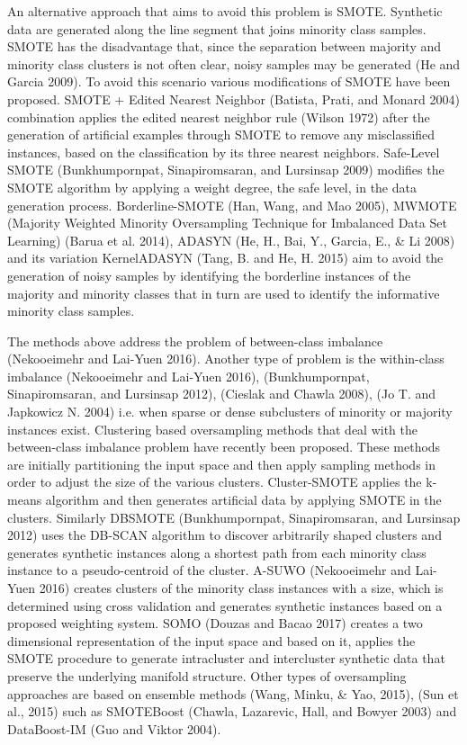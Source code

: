 \documentclass[parskip=full]{scrartcl}
\begin{document}
An alternative approach that aims to avoid this problem is SMOTE. Synthetic data
are generated along the line segment that joins minority class samples. SMOTE
has the disadvantage that, since the separation between majority and minority
class clusters is not often clear, noisy samples may be generated (He and Garcia
2009). To avoid this scenario various modifications of SMOTE have been proposed.
SMOTE + Edited Nearest Neighbor (Batista, Prati, and Monard 2004) combination
applies the edited nearest neighbor rule (Wilson 1972) after the generation of
artificial examples through SMOTE to remove any misclassified instances, based
on the classification by its three nearest neighbors. Safe-Level SMOTE
(Bunkhumpornpat, Sinapiromsaran, and Lursinsap 2009) modifies the SMOTE
algorithm by applying a weight degree, the safe level, in the data generation
process. Borderline-SMOTE (Han, Wang, and Mao 2005), MWMOTE (Majority Weighted
Minority Oversampling Technique for Imbalanced Data Set Learning)  (Barua et al.
2014), ADASYN (He, H., Bai, Y., Garcia, E., & Li 2008) and its variation
KernelADASYN (Tang, B. and He, H. 2015) aim to avoid the generation of noisy
samples by identifying the borderline instances of the majority and minority
classes that in turn are used to identify the informative minority class
samples.  

The methods above address the problem of between-class imbalance (Nekooeimehr
and Lai-Yuen 2016). Another type of problem is the within-class imbalance
(Nekooeimehr and Lai-Yuen 2016), (Bunkhumpornpat, Sinapiromsaran, and Lursinsap
2012), (Cieslak and Chawla 2008), (Jo T. and Japkowicz N. 2004) i.e. when sparse
or dense subclusters of minority or majority instances exist.  Clustering based
oversampling methods that deal with the between-class imbalance problem have
recently been proposed. These methods are initially partitioning the input space
and then apply sampling methods in order to adjust the size of the various
clusters. Cluster-SMOTE applies the k-means algorithm and then generates
artificial data by applying SMOTE in the clusters. Similarly DBSMOTE
(Bunkhumpornpat, Sinapiromsaran, and Lursinsap 2012) uses the DB-SCAN algorithm
to discover arbitrarily shaped clusters and generates synthetic instances along
a shortest path from each minority class instance to a pseudo-centroid of the
cluster. A-SUWO (Nekooeimehr and Lai-Yuen 2016) creates clusters of the minority
class instances with a size, which is determined using cross validation and
generates synthetic instances based on a proposed weighting system. SOMO (Douzas
and Bacao 2017) creates a two dimensional representation of the input space and
based on it, applies the SMOTE procedure to generate intracluster and
intercluster synthetic data that preserve the underlying manifold structure.
Other types of oversampling approaches are based on ensemble methods (Wang,
Minku, & Yao, 2015), (Sun et al., 2015) such as SMOTEBoost (Chawla, Lazarevic,
Hall, and Bowyer 2003) and DataBoost-IM (Guo and Viktor 2004).
\end{document}
